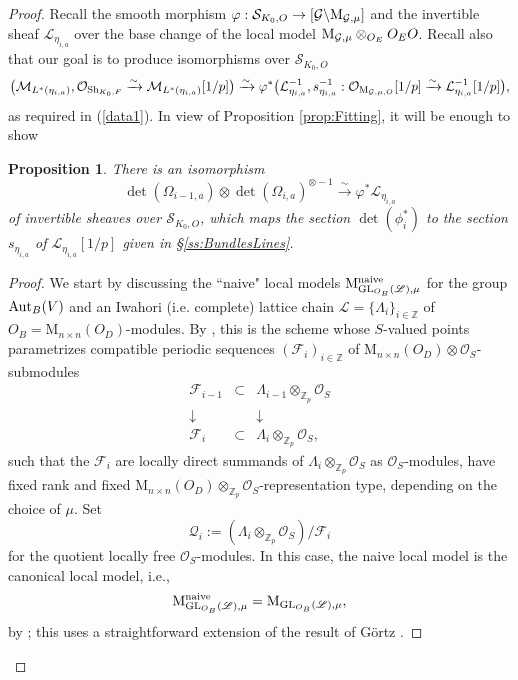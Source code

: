 \documentclass[reqno, 10pt]{amsart}
\makeatletter
\newcommand{\BZ}{\ensuremath{\mathbb {Z}}\xspace}
\newcommand{\CF}{\ensuremath{\mathcal {F}}\xspace}
\newcommand{\CG}{\ensuremath{\mathcal {G}}\xspace}
\newcommand{\CL}{\ensuremath{\mathcal {L}}\xspace}
\newcommand{\CM}{\ensuremath{\mathcal {M}}\xspace}
\newcommand{\CO}{\ensuremath{\mathcal {O}}\xspace}
\newcommand{\CQ}{\ensuremath{\mathcal {Q}}\xspace}
\newcommand{\CS}{\ensuremath{\mathcal {S}}\xspace}
\newcommand{\RM}{\ensuremath{\mathrm {M}}\xspace}
\newcommand{\GL}{\mathrm{GL}}
\newcommand{\bs}{\backslash}
\newtheorem{proposition}[subsubsection]{Proposition}
\theoremstyle{definition}
\numberwithin{equation}{subsection}
\numberwithin{subsubsection}{subsection}
\renewcommand{\to}{%
   \ifbool{@display}{\longrightarrow}{\rightarrow}%
   }
\newcommand{\Mloc}{{\rm M}}
\makeatother
\begin{document}
\begin{proof}
   
Recall the smooth morphism $\varphi: \CS_{K_0,O}\to [\CG\bs \Mloc_{\CG,\mu}]$ and the invertible sheaf $\CL_{\eta_{i,a}}$ over the base change of the local model $\Mloc_{\CG,\mu}\otimes_{O_E}O_EO$. Recall also that our goal is to produce isomorphisms over $\CS_{K_0,O}$ 
  \[
  \big(\CM_{L^*(\eta_{i,a})}, \CO_{{\rm Sh}_{K_0, F}}\xrightarrow{\sim} \CM_{L^*(\eta_{i,a})}[1/p]\big)\xrightarrow{\sim} 
 \varphi^*\big(\CL^{-1}_{\eta_{i,a}}, s^{-1}_{\eta_{i,a}}: \CO_{\Mloc_{\CG,\mu, O}}[1/p]\xrightarrow{\sim} \CL^{-1}_{\eta_{i,a}}[1/p]\big), 
  \]
 as required in (\ref{data1}). In view of Proposition \ref{prop:Fitting}, it will be enough to show
 
\begin{proposition}\label{prop:LBLM}
There is an isomorphism 
  \begin{equation}\label{HodgeIso}
 \det(\Omega_{i-1,a})\otimes \det(\Omega_{i,a} )^{\otimes -1}\xrightarrow{\sim} \varphi^*\CL_{\eta_{i,a}}
 \end{equation}
of invertible sheaves over $\CS_{K_0,O}$, which maps the  section $\det(\phi^*_i)$   to the section $s_{\eta_{i,a}}$ of $\CL_{\eta_{i,a}}[1/p]$ given in  
 \S \ref{ss:BundlesLines}. 
 \end{proposition}
  
   \begin{proof}
   We start by discussing the ``naive" local models $\Mloc^{\rm naive}_{\GL_{O_B}(\mathscr L),\mu}$ for the group ${\rm Aut}_B(V)$ and an Iwahori (i.e. complete) lattice chain  $\mathscr  L=\{\Lambda_i\}_{i\in \BZ}$ of $O_B=\RM_{n\times n}(O_D)$-modules.  By \cite[Def. 3.27]{RZbook}, this is the scheme whose $S$-valued points parametrizes compatible periodic sequences $(\CF_i)_{i\in \BZ}$ of  $\RM_{n\times n}(O_D)\otimes \CO_S$-submodules
   \[
   \begin{matrix}
   \CF_{i-1}&\subset &\Lambda_{i-1}\otimes_{\BZ_p}\CO_S\\
   \downarrow && \downarrow\\
    \CF_{i}&\subset &\Lambda_{i}\otimes_{\BZ_p}\CO_S,
   \end{matrix}
   \]
   such that the $\CF_i$ are locally direct summands of $\Lambda_i\otimes_{\BZ_p}\CO_S$ as $\CO_S$-modules, have
    fixed rank and fixed 
    $\RM_{n\times n}(O_D)\otimes_{\BZ_p} \CO_S$-representation type,  depending on the choice of $\mu$. 
    Set 
    \[
    \CQ_i:=(\Lambda_i\otimes_{\BZ_p}\CO_S)/\CF_i
    \]
    for the quotient locally free $\CO_S$-modules.
    In this case, the naive local model is the canonical local model, i.e.,
     \[
    \Mloc^{\rm naive}_{\GL_{O_B}(\mathscr L),\mu}=\Mloc_{\GL_{O_B}(\mathscr L),\mu},
    \]
     by \cite[\S 7.2, \S 8.2]{PZ}; this uses a straightforward extension of the result of G\"ortz \cite{Goertz}. 
     

\end{proof}
\end{proof}
\end{document}
